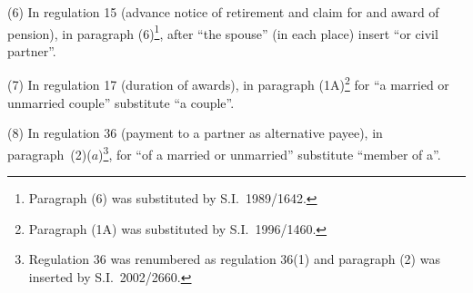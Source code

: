 \documentclass[12pt,a4paper]{article}
\begin{document}
(6) In regulation 15 (advance notice of retirement and claim for and award of pension), in paragraph (6)\footnote{Paragraph (6) was substituted by S.I.\ 1989/1642.}, after “the spouse” (in each place) insert “or civil partner”.

(7) In regulation 17 (duration of awards), in paragraph (1A)\footnote{Paragraph (1A) was substituted by S.I.\ 1996/1460.} for “a married or unmarried couple” substitute “a couple”.

(8) In regulation 36 (payment to a partner as alternative payee), in paragraph~(2)($a$)\footnote{Regulation 36 was renumbered as regulation 36(1) and paragraph (2) was inserted by S.I.\ 2002/2660.}, for “of a married or unmarried” substitute “member of a”.

\end{document}
